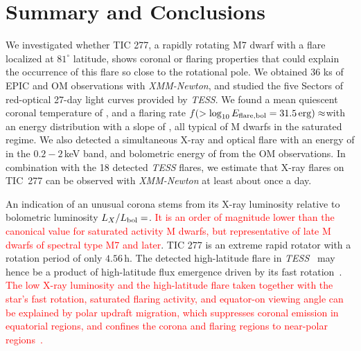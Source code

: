 \documentclass[twocolumn]{aastex631}
\begin{document}







\section{Summary and Conclusions}
\label{sec:summary}
We investigated whether TIC 277, a rapidly rotating M7 dwarf with a flare localized at $81^{\circ}$ latitude, shows coronal or flaring properties that could explain the occurrence of this flare so close to the rotational pole. We obtained 36 ks of EPIC and OM observations with \textit{XMM-Newton}, and studied the five Sectors of red-optical 27-day light curves provided by \textit{TESS}. We found a mean quiescent coronal temperature of \Tqmean, and a flaring rate $f(> \log_{10} E_{\rm flare, bol} = 31.5\,\rm{erg})\approx$\ffdr with an energy distribution with a slope of \ffdalpha, all typical of M dwarfs in the saturated regime. We also detected a simultaneous X-ray and optical flare with an energy of \eepic in the $0.2-2\,$keV band, and bolometric energy of \eom from the OM observations. In combination with the 18 detected \textit{TESS} flares, we estimate that X-ray flares on TIC~277 can be observed with \textit{XMM-Newton} at least about once a day. %

An indication of an unusual corona stems from its X-ray luminosity relative to bolometric luminosity $L_X/L_{\rm bol}=$\LXLbol. \textcolor{red}{It is an order of magnitude lower than the canonical value for saturated activity M dwarfs, but representative of late M dwarfs of spectral type M7 and later}. TIC 277 is an extreme rapid rotator with a rotation period of only $4.56\,$h. The detected high-latitude flare in \textit{TESS}~\citep{ilin2021giant} may hence be a product of high-latitude flux emergence driven by its fast rotation~\citep{weber2016modeling,weber2017suppression}. \textcolor{red}{The low X-ray luminosity and the high-latitude flare taken together with the star's fast rotation, saturated flaring activity, and equator-on viewing angle can be explained by polar updraft migration, which suppresses coronal emission in equatorial regions, and confines the corona and flaring regions to near-polar regions~\citep{stepien2001rosat}. }
\end{document}
